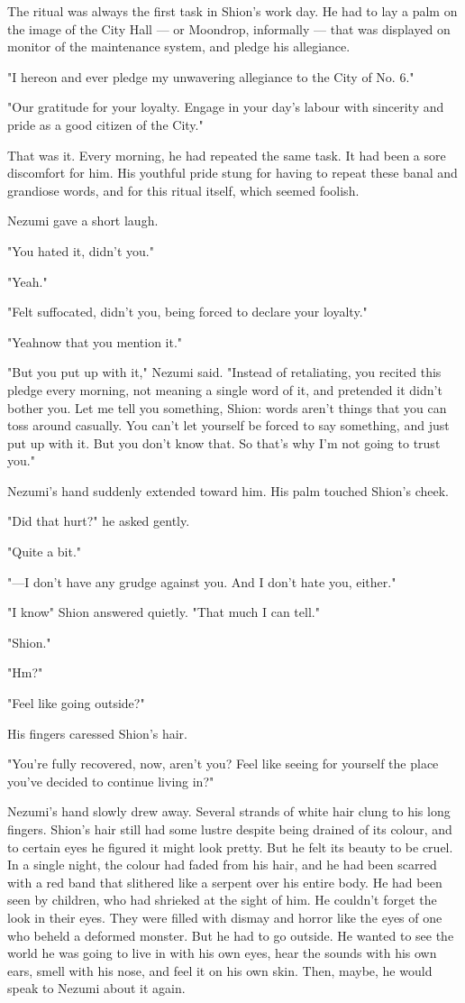 The ritual was always the first task in Shion's work day. He had to lay
a palm on the image of the City Hall --- or Moondrop, informally --- that
was displayed on monitor of the maintenance system, and pledge his
allegiance.

"I hereon and ever pledge my unwavering allegiance to the City of No.
6."

"Our gratitude for your loyalty. Engage in your day's labour with
sincerity and pride as a good citizen of the City."

That was it. Every morning, he had repeated the same task. It had been a
sore discomfort for him. His youthful pride stung for having to repeat
these banal and grandiose words, and for this ritual itself, which
seemed foolish.

Nezumi gave a short laugh.

"You hated it, didn't you."

"Yeah."

"Felt suffocated, didn't you, being forced to declare your loyalty."

"Yeah\el now that you mention it."

"But you put up with it," Nezumi said. "Instead of retaliating, you
recited this pledge every morning, not meaning a single word of it, and
pretended it didn't bother you. Let me tell you something, Shion: words
aren't things that you can toss around casually. You can't let yourself
be forced to say something, and just put up with it. But you don't know
that. So that's why I'm not going to trust you."

Nezumi's hand suddenly extended toward him. His palm touched Shion's
cheek.

"Did that hurt?" he asked gently.

"Quite a bit."

"---I don't have any grudge against you. And I don't hate you, either."

"I know\el " Shion answered quietly. "That much I can tell."

"Shion."

"Hm?"

"Feel like going outside?"

His fingers caressed Shion's hair.

"You're fully recovered, now, aren't you? Feel like seeing for yourself
the place you've decided to continue living in?"

Nezumi's hand slowly drew away. Several strands of white hair clung to
his long fingers. Shion's hair still had some lustre despite being
drained of its colour, and to certain eyes he figured it might look
pretty. But he felt its beauty to be cruel. In a single night, the
colour had faded from his hair, and he had been scarred with a red band
that slithered like a serpent over his entire body. He had been seen by
children, who had shrieked at the sight of him. He couldn't forget the
look in their eyes. They were filled with dismay and horror like the
eyes of one who beheld a deformed monster. But he had to go outside. He
wanted to see the world he was going to live in with his own eyes, hear
the sounds with his own ears, smell with his nose, and feel it on his
own skin. Then, maybe, he would speak to Nezumi about it again.

